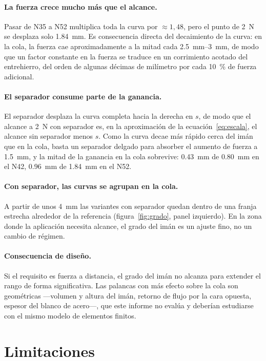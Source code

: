 \documentclass[11pt,a4paper]{article}
\begin{document}
\paragraph{La fuerza crece mucho más que el alcance.}
Pasar de N35 a N52 multiplica toda la curva por $\approx 1{,}48$, pero el punto de \SI{2}{N}
se desplaza solo \SI{1,84}{mm}. Es consecuencia directa del decaimiento de la curva: en la
cola, la fuerza cae aproximadamente a la mitad cada \SIrange{2,5}{3}{mm}, de modo que un factor
constante en la fuerza se traduce en un corrimiento acotado del entrehierro, del orden de
algunas décimas de milímetro por cada \SI{10}{\percent} de fuerza adicional.

\paragraph{El separador consume parte de la ganancia.}
El separador desplaza la curva completa hacia la derecha en $s$, de modo que el alcance a
\SI{2}{N} con separador es, en la aproximación de la ecuación~\eqref{eq:escala}, el alcance
sin separador menos $s$. Como la curva decae más rápido cerca del imán que en la cola, basta un
separador delgado para absorber el aumento de fuerza a \SI{1,5}{mm}, y la mitad de la
ganancia en la cola sobrevive: \SI{0,43}{mm} de \SI{0,80}{mm} en el N42, \SI{0,96}{mm} de
\SI{1,84}{mm} en el N52.

\paragraph{Con separador, las curvas se agrupan en la cola.}
A partir de unos \SI{4}{mm} las variantes con separador quedan dentro de una franja estrecha
alrededor de la referencia (figura~\ref{fig:grado}, panel izquierdo). En la zona donde la
aplicación necesita alcance, el grado del imán es un ajuste fino, no un cambio de régimen.

\paragraph{Consecuencia de diseño.}
Si el requisito es fuerza a distancia, el grado del imán no alcanza para extender el rango de
forma significativa. Las palancas con más efecto sobre la cola son geométricas ---volumen y
altura del imán, retorno de flujo por la cara opuesta, espesor del blanco de acero---, que
este informe no evalúa y deberían estudiarse con el mismo modelo de elementos finitos.

\section{Limitaciones}
\end{document}
